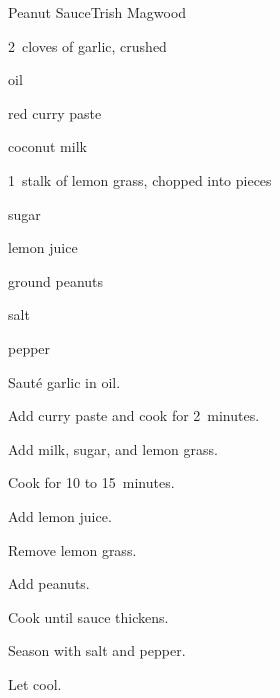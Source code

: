 \begin{recipe}{Peanut Sauce}{Trish Magwood}{}

\begin{ingredients}
\item 2~cloves of garlic, crushed
\item {} oil
\item {} red curry paste
\item {} coconut milk
\item 1~stalk of lemon grass, chopped into  pieces
\item \C{\quarter} sugar
\item \C{\quarter} lemon juice
\item {} ground peanuts
\item salt
\item pepper
\end{ingredients}

\begin{directions}
\item Saut\'e garlic in oil.
\item Add curry paste and cook for 2~minutes.
\item Add milk, sugar, and lemon grass.
\item Cook for 10 to 15~minutes.
\item Add lemon juice.
\item Remove lemon grass.
\item Add peanuts.
\item Cook until sauce thickens.
\item Season with salt and pepper.
\item Let cool.
\end{directions}

\end{recipe}
